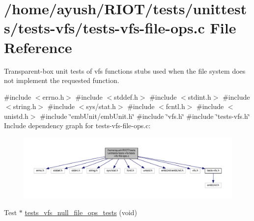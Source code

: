 \hypertarget{tests-vfs-file-ops_8c}{}\section{/home/ayush/\+R\+I\+O\+T/tests/unittests/tests-\/vfs/tests-\/vfs-\/file-\/ops.c File Reference}
\label{tests-vfs-file-ops_8c}


Transparent-\/box unit tests of vfs functions stubs used when the file system does not implement the requested function.  


{\ttfamily \#include $<$errno.\+h$>$}\newline
{\ttfamily \#include $<$stddef.\+h$>$}\newline
{\ttfamily \#include $<$stdint.\+h$>$}\newline
{\ttfamily \#include $<$string.\+h$>$}\newline
{\ttfamily \#include $<$sys/stat.\+h$>$}\newline
{\ttfamily \#include $<$fcntl.\+h$>$}\newline
{\ttfamily \#include $<$unistd.\+h$>$}\newline
{\ttfamily \#include \char`\"{}emb\+Unit/emb\+Unit.\+h\char`\"{}}\newline
{\ttfamily \#include \char`\"{}vfs.\+h\char`\"{}}\newline
{\ttfamily \#include \char`\"{}tests-\/vfs.\+h\char`\"{}}\newline
Include dependency graph for tests-\/vfs-\/file-\/ops.c\+:
\nopagebreak
\begin{figure}[H]
\begin{center}
\leavevmode
\includegraphics[width=350pt]{tests-vfs-file-ops_8c__incl}
\end{center}
\end{figure}
\begin{DoxyCompactItemize}
\item 
Test $\ast$ \hyperlink{tests-vfs-file-ops_8c_aa3c93ba92be080dce73d6ef5688ffb8b}{tests\+\_\+vfs\+\_\+null\+\_\+file\+\_\+ops\+\_\+tests} (void)
\end{DoxyCompactItemize}


